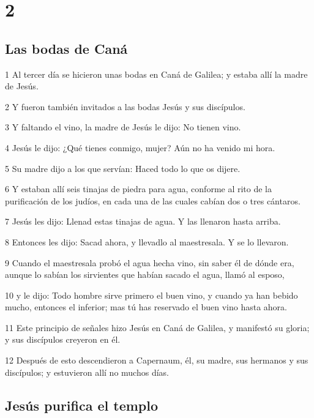 \chapter{2}

\section*{Las bodas de Caná}

\par 1 Al tercer día se hicieron unas bodas en Caná de Galilea; y estaba allí la madre de Jesús.
\par 2 Y fueron también invitados a las bodas Jesús y sus discípulos.
\par 3 Y faltando el vino, la madre de Jesús le dijo: No tienen vino.
\par 4 Jesús le dijo: ¿Qué tienes conmigo, mujer? Aún no ha venido mi hora.
\par 5 Su madre dijo a los que servían: Haced todo lo que os dijere.
\par 6 Y estaban allí seis tinajas de piedra para agua, conforme al rito de la purificación de los judíos, en cada una de las cuales cabían dos o tres cántaros.
\par 7 Jesús les dijo: Llenad estas tinajas de agua. Y las llenaron hasta arriba.
\par 8 Entonces les dijo: Sacad ahora, y llevadlo al maestresala. Y se lo llevaron.
\par 9 Cuando el maestresala probó el agua hecha vino, sin saber él de dónde era, aunque lo sabían los sirvientes que habían sacado el agua, llamó al esposo,
\par 10 y le dijo: Todo hombre sirve primero el buen vino, y cuando ya han bebido mucho, entonces el inferior; mas tú has reservado el buen vino hasta ahora.
\par 11 Este principio de señales hizo Jesús en Caná de Galilea, y manifestó su gloria; y sus discípulos creyeron en él.
\par 12 Después de esto descendieron a Capernaum, él, su madre, sus hermanos y sus discípulos; y estuvieron allí no muchos días.

\section*{Jesús purifica el templo}

